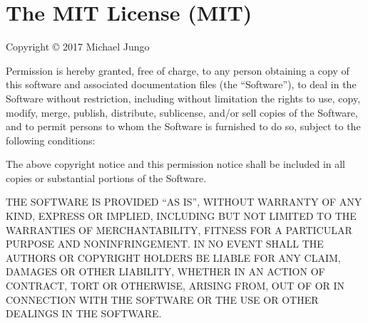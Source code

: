 \chapter{The MIT License (MIT)}
\hypertarget{md_node__modules_2xxhash-wasm_2_l_i_c_e_n_s_e}{}\label{md_node__modules_2xxhash-wasm_2_l_i_c_e_n_s_e}
Copyright © 2017 Michael Jungo

Permission is hereby granted, free of charge, to any person obtaining a copy of this software and associated documentation files (the “\+Software”), to deal in the Software without restriction, including without limitation the rights to use, copy, modify, merge, publish, distribute, sublicense, and/or sell copies of the Software, and to permit persons to whom the Software is furnished to do so, subject to the following conditions\+:

The above copyright notice and this permission notice shall be included in all copies or substantial portions of the Software.

THE SOFTWARE IS PROVIDED “\+AS IS”, WITHOUT WARRANTY OF ANY KIND, EXPRESS OR IMPLIED, INCLUDING BUT NOT LIMITED TO THE WARRANTIES OF MERCHANTABILITY, FITNESS FOR A PARTICULAR PURPOSE AND NONINFRINGEMENT. IN NO EVENT SHALL THE AUTHORS OR COPYRIGHT HOLDERS BE LIABLE FOR ANY CLAIM, DAMAGES OR OTHER LIABILITY, WHETHER IN AN ACTION OF CONTRACT, TORT OR OTHERWISE, ARISING FROM, OUT OF OR IN CONNECTION WITH THE SOFTWARE OR THE USE OR OTHER DEALINGS IN THE SOFTWARE. 